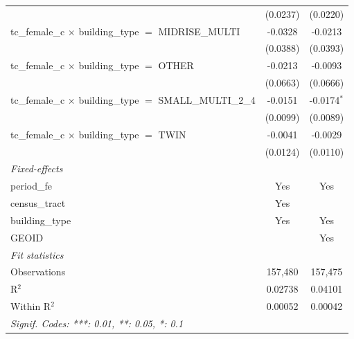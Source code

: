 \begin{tabular}{lcc}
                                                                       & (0.0237)       & (0.0220)\\   
   tc\_female\_c $\times$ building\_type $=$ MIDRISE\_MULTI            & -0.0328        & -0.0213\\   
                                                                       & (0.0388)       & (0.0393)\\   
   tc\_female\_c $\times$ building\_type $=$ OTHER                     & -0.0213        & -0.0093\\   
                                                                       & (0.0663)       & (0.0666)\\   
   tc\_female\_c $\times$ building\_type $=$ SMALL\_MULTI\_2\_4        & -0.0151        & -0.0174$^{*}$\\   
                                                                       & (0.0099)       & (0.0089)\\   
   tc\_female\_c $\times$ building\_type $=$ TWIN                      & -0.0041        & -0.0029\\   
                                                                       & (0.0124)       & (0.0110)\\   
   \midrule
   \emph{Fixed-effects}\\
   period\_fe                                                          & Yes            & Yes\\  
   census\_tract                                                       & Yes            & \\  
   building\_type                                                      & Yes            & Yes\\  
   GEOID                                                               &                & Yes\\  
   \midrule
   \emph{Fit statistics}\\
   Observations                                                        & 157,480        & 157,475\\  
   R$^2$                                                               & 0.02738        & 0.04101\\  
   Within R$^2$                                                        & 0.00052        & 0.00042\\  
   \midrule \midrule
   \multicolumn{3}{l}{\emph{Signif. Codes: ***: 0.01, **: 0.05, *: 0.1}}\\
\end{tabular}
